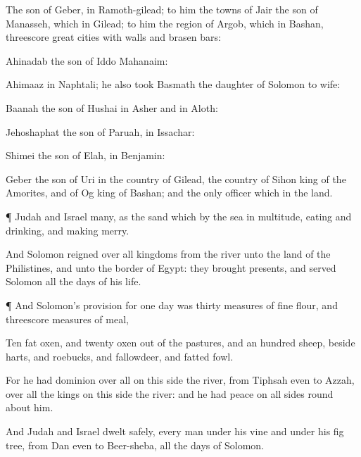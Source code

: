 {The son of
Geber, in
Ramoth-gilead; to him
{} the
towns of
Jair the
son of
Manasseh, which
{} in
Gilead; to him
{} the
region of
Argob, which
{} in
Bashan,
threescore
great
cities with
walls and
brasen
bars:

Ahinadab the
son of
Iddo
{}
Mahanaim:

Ahimaaz
{} in
Naphtali; he also
took
Basmath the
daughter of
Solomon to
wife:

Baanah the
son of
Hushai
{} in
Asher and in
Aloth:

Jehoshaphat the
son of
Paruah, in
Issachar:

Shimei the
son of
Elah, in
Benjamin:

Geber the
son of
Uri
{} in the
country of
Gilead,
{} the
country of
Sihon
king of the
Amorites, and of
Og
king of
Bashan; and
{} the
only
officer which
{} in the
land.


\par }{\PP {}¶
Judah and
Israel
{}
many, as the
sand which
{} by the
sea in
multitude,
eating and
drinking, and making
merry.

And
Solomon
reigned over all
kingdoms from the
river unto the
land of the
Philistines, and unto the
border of
Egypt: they
brought
presents, and
served
Solomon all the
days of his
life.


\par }{\PP {}¶ And
Solomon’s
provision for
one
day was
thirty
measures of fine
flour, and
threescore
measures of
meal,

Ten
fat
oxen, and
twenty
oxen out of the
pastures, and an
hundred
sheep, beside
harts, and
roebucks, and
fallowdeer, and
fatted
fowl.

For he had
dominion over all
{} on this
side the
river, from
Tiphsah even to
Azzah, over all the
kings on this
side the
river: and he had
peace on all
sides round
about him.

And
Judah and
Israel
dwelt
safely, every
man under his
vine and under his fig
tree, from
Dan even to
Beer-sheba, all the
days of
Solomon.


}
